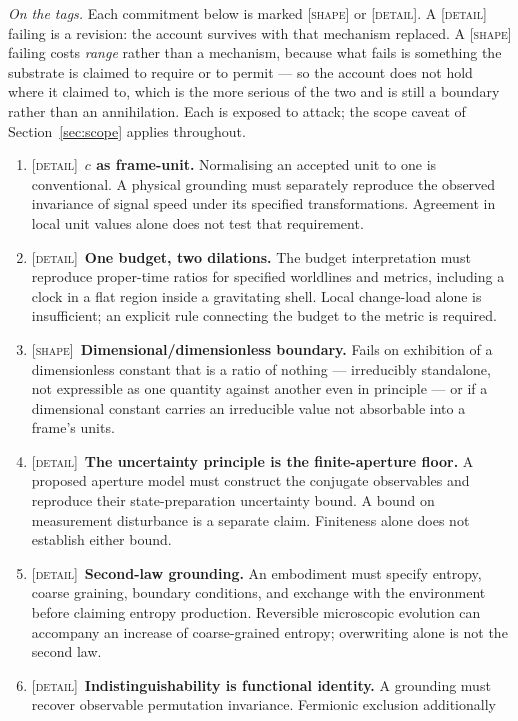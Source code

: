 \documentclass[11pt,a4paper]{article}
\theoremstyle{remark}\newtheorem{remark}[definition]{Remark}
\begin{document}
\noindent\emph{On the tags.} Each commitment below is marked \textsc{[shape]} or \textsc{[detail]}.
A \textsc{[detail]} failing is a revision: the account survives with that mechanism replaced. A
\textsc{[shape]} failing costs \emph{range} rather than a mechanism, because what fails is something
the substrate is claimed to require or to permit --- so the account does not hold where it claimed to,
which is the more serious of the two and is still a boundary rather than an annihilation.
Each is exposed to attack; the scope caveat of Section~\ref{sec:scope} applies
throughout.
\begin{enumerate}[leftmargin=*]
\item \textsc{[detail]}~\textbf{$c$ as frame-unit.} Normalising an accepted unit to one is
conventional. A physical grounding must separately reproduce the observed
invariance of signal speed under its specified transformations. Agreement in
local unit values alone does not test that requirement.
\item \textsc{[detail]}~\textbf{One budget, two dilations.} The budget interpretation must reproduce
proper-time ratios for specified worldlines and metrics, including a clock in a
flat region inside a gravitating shell. Local change-load alone is insufficient;
an explicit rule connecting the budget to the metric is required.
\item \textsc{[shape]}~\textbf{Dimensional/dimensionless boundary.} Fails on exhibition of a
dimensionless constant that is a ratio of nothing --- irreducibly standalone, not expressible as one
quantity against another even in principle --- or if a dimensional constant carries an irreducible
value not absorbable into a frame's units.
\item \textsc{[detail]}~\textbf{The uncertainty principle is the finite-aperture floor.}
A proposed aperture model must construct the conjugate observables and reproduce
their state-preparation uncertainty bound. A bound on measurement disturbance is
a separate claim. Finiteness alone does not establish either bound.
\item \textsc{[detail]}~\textbf{Second-law grounding.} An embodiment must specify entropy,
coarse graining, boundary conditions, and exchange with the environment before
claiming entropy production. Reversible microscopic evolution can accompany an
increase of coarse-grained entropy; overwriting alone is not the second law.
\item \textsc{[detail]}~\textbf{Indistinguishability is functional identity.} A grounding must
recover observable permutation invariance. Fermionic exclusion additionally

\end{enumerate}
\end{document}
